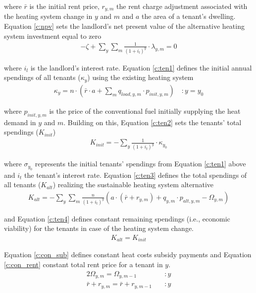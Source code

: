 where $\bar{r}$ is the initial rent price, $r_{y,m}$ the rent charge adjustment associated with the heating system change in $y$ and $m$ and $a$ the area of a tenant's dwelling. Equation \ref{c:npv} sets the landlord's net present value of the alternative heating system investment equal to zero
\begin{align}\label{c:npv}
-\zeta + \sum_{y} \sum_{m} \frac{1}{(1+i_l)^y} \cdot \lambda_{y,m} = 0
\end{align}

where $i_l$ is the landlord's interest rate. Equation \ref{c:ten1} defines the initial annual spendings of all tenants ($\kappa_{y}$) using the existing heating system 
\begin{align}\label{c:ten1}
\kappa_{y} = n \cdot (\bar{r} \cdot a + \sum_{m} q_{load,y,m} \cdot p_{init,y,m}) \quad :y=y_0
\end{align}

where $p_{init,y,m}$ is the price of the conventional fuel initially supplying the heat demand in $y$ and $m$. Building on this, Equation \ref{c:ten2} sets the tenants' total spendings ($K_{init}$)
\begin{align}\label{c:ten2}
K_{init} = -\sum_{y} \frac{1}{(1+i_{t})^y} \cdot \kappa_{y_0}
\end{align}

where $\sigma_{y_0}$ represents the initial tenants' spendings from Equation \ref{c:ten1} above and $i_t$ the tenant's interest rate. Equation \ref{c:ten3} defines the total spendings of all tenants ($K_{alt}$) realizing the sustainable heating system alternative
\begin{align}\label{c:ten3}
	K_{alt} = -\sum_{y} \sum_{m} \frac{n}{(1+i_{t})^y} \left(a \cdot (\bar{r} + r_{y,m}) + q_{y,m} \cdot p_{alt,y,m}-\Omega_{y,m} \right)
\end{align}

and Equation \ref{c:ten4} defines constant remaining spendings (i.e., economic viability) for the tenants in case of the heating system change.
\begin{align}\label{c:ten4}
K_{alt} = K_{init}
\end{align}

Equation \ref{c:con_sub} defines constant heat costs subsidy payments and Equation \ref{c:con_rent} constant total rent price for a tenant in $y$.
\begin{alignat}{2}
\Omega_{y,m} = \Omega_{y,m-1} \quad &:y\label{c:con_sub}\\
\bar{r} + r_{y,m} = \bar{r} + r_{y,m-1} \quad &:y\label{c:con_rent}
\end{alignat}

